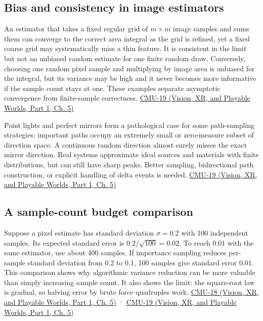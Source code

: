 \subsection{Bias and consistency in image estimators}\label{03-visual-computing-i-ch012-bias-and-consistency-in-image-estimators}

\hypertarget{03-visual-computing-i-ch012-bias-and-consistency-in-image-estimators}{}

An estimator that takes a fixed regular grid of \(m\times m\) image samples and sums them can converge to the correct area integral as the grid is refined, yet a fixed coarse grid may systematically miss a thin feature. It is consistent in the limit but not an unbiased random estimate for one finite random draw. Conversely, choosing one random pixel sample and multiplying by image area is unbiased for the integral, but its variance may be high and it never becomes more informative if the sample count stays at one. These examples separate asymptotic convergence from finite-sample correctness. \href{../07-Vision-XR-and-Playable-Worlds-P01/main.pdf\#nameddest=04-visual-computing-ii-ch036-cmu-19---variance-reduction}{CMU-19 (Vision, XR, and Playable Worlds, Part 1, Ch. 5)}

Point lights and perfect mirrors form a pathological case for some path-sampling strategies: important paths occupy an extremely small or zero-measure subset of direction space. A continuous random direction almost surely misses the exact mirror direction. Real systems approximate ideal sources and materials with finite distributions, but can still have sharp peaks. Better sampling, bidirectional path construction, or explicit handling of delta events is needed. \href{../07-Vision-XR-and-Playable-Worlds-P01/main.pdf\#nameddest=04-visual-computing-ii-ch036-cmu-19---variance-reduction}{CMU-19 (Vision, XR, and Playable Worlds, Part 1, Ch. 5)}

\subsection{A sample-count budget comparison}\label{03-visual-computing-i-ch012-a-sample-count-budget-comparison}

\hypertarget{03-visual-computing-i-ch012-a-sample-count-budget-comparison}{}

Suppose a pixel estimate has standard deviation \(\sigma=0.2\) with 100 independent samples. Its expected standard error is \(0.2/\sqrt{100}=0.02\). To reach 0.01 with the same estimator, use about 400 samples. If importance sampling reduces per-sample standard deviation from 0.2 to 0.1, 100 samples give standard error 0.01. This comparison shows why algorithmic variance reduction can be more valuable than simply increasing sample count. It also shows the limit: the square-root law is gradual, so halving error by brute force quadruples work. \href{../07-Vision-XR-and-Playable-Worlds-P01/main.pdf\#nameddest=04-visual-computing-ii-ch036-cmu-18---monte-carlo-rendering}{CMU-18 (Vision, XR, and Playable Worlds, Part 1, Ch. 5)} · \href{../07-Vision-XR-and-Playable-Worlds-P01/main.pdf\#nameddest=04-visual-computing-ii-ch036-cmu-19---variance-reduction}{CMU-19 (Vision, XR, and Playable Worlds, Part 1, Ch. 5)}

